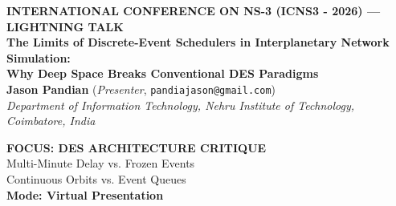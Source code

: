 \documentclass[9pt]{article}
\begin{document}

\begin{tcolorbox}[enhanced, colback=spaceNavy, colframe=electricCyan, boxrule=1.5pt, arc=5pt,
    left=9pt, right=9pt, top=5pt, bottom=5pt]
    \begin{minipage}[c]{0.74\textwidth}
        {\fontsize{7.5pt}{9pt}\selectfont \color{electricCyan}\textbf{INTERNATIONAL CONFERENCE ON NS-3 (ICNS3 - 2026) --- LIGHTNING TALK}}\\[2pt]
        {\fontsize{13pt}{15pt}\selectfont \color{white}\textbf{The Limits of Discrete-Event Schedulers in Interplanetary Network Simulation:}}\\[1pt]
        {\fontsize{11pt}{13pt}\selectfont \color{pillCyan}\textbf{Why Deep Space Breaks Conventional DES Paradigms}}\\[3pt]
        {\fontsize{8pt}{10pt}\selectfont \color{gray!30}\textbf{Jason Pandian} (\textit{Presenter}, \texttt{pandiajason@gmail.com})\\
        \textit{Department of Information Technology, Nehru Institute of Technology, Coimbatore, India}}
    \end{minipage}%
    \hfill
    \begin{minipage}[c]{0.24\textwidth}
        \centering
        \begin{tcolorbox}[colback=pillBg, colframe=electricCyan, boxrule=0.8pt, arc=3pt, left=4pt, right=4pt, top=3pt, bottom=3pt]
            \centering
            {\fontsize{7pt}{8pt}\selectfont \color{pillCyan}\textbf{FOCUS: DES ARCHITECTURE CRITIQUE}}\\[1pt]
            {\fontsize{6.5pt}{7.5pt}\selectfont \color{white} Multi-Minute Delay vs. Frozen Events}\\
            {\fontsize{6.5pt}{7.5pt}\selectfont \color{white} Continuous Orbits vs. Event Queues}\\
            {\fontsize{6.5pt}{7.5pt}\selectfont \color{lightAmber}\textbf{Mode: Virtual Presentation}}
        \end{tcolorbox}
    \end{minipage}
\end{tcolorbox}

\vspace{0.1cm}
\end{document}
